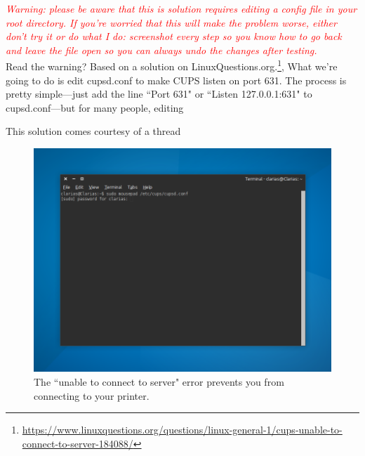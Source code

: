 \documentclass[12pt, a4paper]{article}
\begin{document}
\emph{\textcolor{Red}{Warning: please be aware that this is solution requires editing a config file in your root directory. If you're worried that this will make the problem worse, either don't try it or do what I do: screenshot every step so you know how to go back and leave the file open so you can always undo the changes after testing.}}\\

\noindent Read the warning? Based on a solution on LinuxQuestions.org.\footnote{\url{https://www.linuxquestions.org/questions/linux-general-1/cups-unable-to-connect-to-server-184088/}},  What we're going to do is edit cupsd.conf to make CUPS listen on port 631. The process is pretty simple---just add the line ``Port 631" or ``Listen 127.0.0.1:631" to cupsd.conf---but for many people, editing 


This solution comes courtesy of a thread 

















\begin{figure}[!htp]
  \centering
  \includegraphics[width=1\textwidth]{imgs/unable-to-connect-to-server-2.png}
  \caption{The ``unable to connect to server" error prevents you from connecting to your printer.}
  \label{fig12}
\end{figure}
\end{document}
